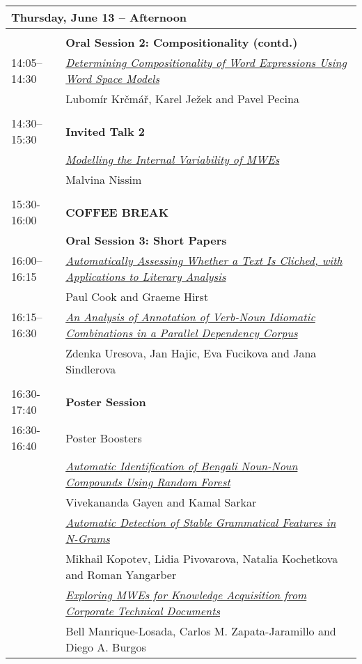 \newpage

\begin{tabular}{p{20mm}p{138mm}}
\hline
\multicolumn{2}{l}{\bf Thursday, June 13 -- Afternoon} \\
\hline
\\
 & {\bf Oral Session 2: Compositionality (contd.)} \\
 14:05--14:30 & \hyperlink{page.42}{\em Determining Compositionality of Word Expressions Using Word Space Models}\\
         & Lubom\'{i}r Kr\v{c}m\'{a}ř, Karel Je\v{z}ek and Pavel Pecina \\
\\
14:30--15:30 & {\bf Invited Talk 2} \\
 & \hyperlink{page.51}{\em Modelling the Internal Variability of {MWE}s}\\
         & Malvina Nissim \\
\\
15:30-16:00 & {\bf COFFEE BREAK} \\
 & {\bf Oral Session 3: Short Papers} \\
16:00--16:15 & \hyperlink{page.52}{\em Automatically Assessing Whether a Text Is Cliched, with Applications to Literary Analysis}\\
         & Paul Cook and Graeme Hirst \\
16:15--16:30 & \hyperlink{page.58}{\em An Analysis of Annotation of Verb-Noun Idiomatic Combinations in a Parallel Dependency Corpus}\\
         & Zdenka Uresova, Jan Hajic, Eva Fucikova and Jana Sindlerova \\
\\
16:30-17:40 & {\bf Poster Session} \\
16:30-16:40 & Poster Boosters \\
 & \hyperlink{page.64}{\em Automatic Identification of {B}engali Noun-Noun Compounds Using Random Forest}\\
         & Vivekananda Gayen and Kamal Sarkar \\
 & \hyperlink{page.73}{\em Automatic Detection of Stable Grammatical Features in N-Grams}\\
         & Mikhail Kopotev, Lidia Pivovarova, Natalia Kochetkova and Roman Yangarber \\
 & \hyperlink{page.82}{\em Exploring {MWE}s for Knowledge Acquisition from Corporate Technical Documents}\\
         & Bell Manrique-Losada, Carlos M. Zapata-Jaramillo and Diego A. Burgos \\

\end{tabular}
